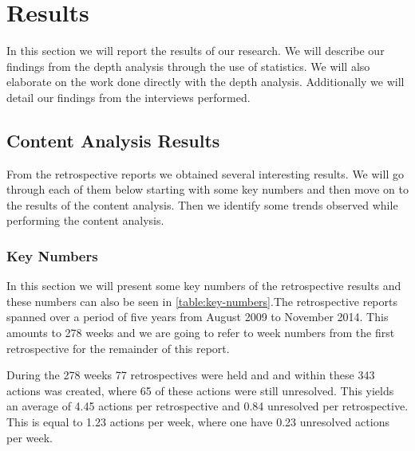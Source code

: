\chapter{Results}

In this section we will report the results of our research. We will describe our findings from the depth analysis through the use of statistics. We will also elaborate on the work done directly with the depth analysis. Additionally we will detail our findings from the interviews performed.

\clearpage
\section{Content Analysis Results}
From the retrospective reports we obtained several interesting results. We will go through each of them below starting with some key numbers and then move on to the results of the content analysis. Then we identify some trends observed while performing the content analysis. 

\subsection{Key Numbers}
In this section we will present some key numbers of the retrospective results and these numbers can also be seen in \autoref{table:key-numbers}.The retrospective reports spanned over a period of five years from August 2009 to November 2014. This amounts to 278 weeks and we are going to refer to week numbers from the first retrospective for the remainder of this report. 
\begin{table}[!h]
	\begin{center}
	\caption{Some key numbers from the retrospectives}
	\label{table:key-numbers}
\end{center}
\end{table}
During the 278 weeks 77 retrospectives were held and and within these 343 actions was created, where 65 of these actions were still unresolved. This yields an average of 4.45 actions per retrospective and 0.84 unresolved per retrospective. This is equal to 1.23 actions per week, where one have 0.23 unresolved actions per week. 

